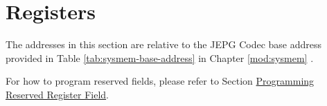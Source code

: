 \documentclass[main\_\_EN.tex]{subfiles}
\begin{document}
\newpage

\section{Registers}

The addresses in this section are relative to the JEPG Codec base address provided in Table \ref{tab:sysmem-base-address} in Chapter \ref{mod:sysmem} \textit{}.

For how to program reserved fields, please refer to Section \hyperref[programming-reserved-field]{Programming Reserved Register Field}.


\end{document}
